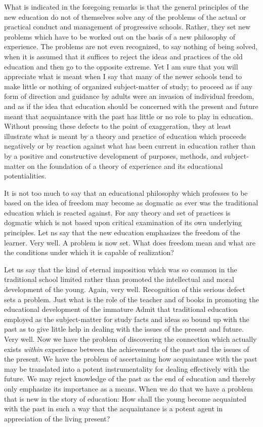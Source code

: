 What is indicated in the foregoing remarks is that the general principles of the new 
education do not of themselves solve any of the problems of the actual or practical 
conduct and management of progressive schools. Rather, they set new problems which 
have to be worked out on the basis of a new philosophy of experience. The problems are 
not even recognized, to say nothing of being solved, when it is assumed that it suffices to 
reject the ideas and practices of the old education and then go to the opposite extreme. 
Yet I am sure that you will appreciate what is meant when I say that many of the newer 
schools tend to make little or nothing of organized subject-matter of study; to proceed as 
if any form of direction and guidance by adults were an invasion of individual freedom, 
and as if the idea that education should be concerned with the present and future meant 
that acquaintance with the past has little or no role to play in education. Without pressing 
these defects to the point of exaggeration, they at least illustrate what is meant by a 
theory and practice of education which proceeds negatively or by reaction against what 
has been current in education rather than by a positive and constructive development of 
purposes, methods, and subject-matter on the foundation of a theory of experience and its 
educational potentialities. 

It is not too much to say that an educational philosophy which professes to be based 
on the idea of freedom may become as dogmatic as ever was the traditional education 
which is reacted against. For any theory and set of practices is dogmatic which is not 
based upon critical examination of its own underlying principles. Let ns say that the new 
education emphasizes the freedom of the learner. Very well. A problem is now set. What 
does freedom mean and what are the conditions under which it is capable of realization? 



Let us say that the kind of eternal imposition which was so common in the traditional 
school limited rather than promoted the intellectual and moral development of the young. 
Again, very well. Recognition of this serious defect sets a problem. Just what is the role 
of the teacher and of books in promoting the educational development of the immature 
Admit that traditional education employed as the subject-matter for study facts and ideas 
so bound up with the past as to give little help in dealing with the issues of the present 
and future. Very well. Now we have the problem of discovering the connection which 
actually exists \textit{within} experience between the achievements of the past and the issues of 
the present. We have the problem of ascertaining how acquaintance with the past may be 
translated into a potent instrumentality for dealing effectively with the future. We may 
reject knowledge of the past as the end of education and thereby only emphasize its 
importance as a means. When we do that we have a problem that is new in the story of 
education: How shall the young become acquainted with the past in such a way that the 
acquaintance is a potent agent in appreciation of the living present? 

